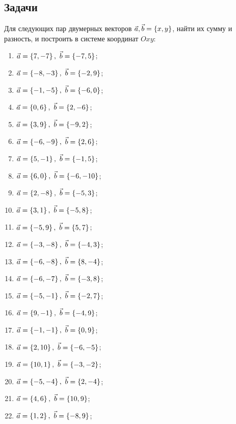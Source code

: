 \subsection{Задачи}

	Для следующих пар двумерных векторов $\va, \vb = \bracs{x, y}$, найти их сумму и разность, и построить в системе координат $Oxy$:

	\begin{multicols}{2}
		\begin{enumerate}
			\setcounter{enumi}{\value{tasks}}

			\item \( \displaystyle \va = \bracs{7, -7}, ~ \vb = \bracs{-7, 5} \);
			\item \( \displaystyle \va = \bracs{-8, -3}, ~ \vb = \bracs{-2, 9} \);
			\item \( \displaystyle \va = \bracs{-1, -5}, ~ \vb = \bracs{-6, 0} \);
			\item \( \displaystyle \va = \bracs{0, 6}, ~ \vb = \bracs{2, -6} \);
			\item \( \displaystyle \va = \bracs{3, 9}, ~ \vb = \bracs{-9, 2} \);
			\item \( \displaystyle \va = \bracs{-6, -9}, ~ \vb = \bracs{2, 6} \);
			\item \( \displaystyle \va = \bracs{5, -1}, ~ \vb = \bracs{-1, 5} \);
			\item \( \displaystyle \va = \bracs{6, 0}, ~ \vb = \bracs{-6, -10} \);
			\item \( \displaystyle \va = \bracs{2, -8}, ~ \vb = \bracs{-5, 3} \);
			\item \( \displaystyle \va = \bracs{3, 1}, ~ \vb = \bracs{-5, 8} \);
			\item \( \displaystyle \va = \bracs{-5, 9}, ~ \vb = \bracs{5, 7} \);
			\item \( \displaystyle \va = \bracs{-3, -8}, ~ \vb = \bracs{-4, 3} \);
			\item \( \displaystyle \va = \bracs{-6, -8}, ~ \vb = \bracs{8, -4} \);
			\item \( \displaystyle \va = \bracs{-6, -7}, ~ \vb = \bracs{-3, 8} \);
			\item \( \displaystyle \va = \bracs{-5, -1}, ~ \vb = \bracs{-2, 7} \);
			\item \( \displaystyle \va = \bracs{9, -1}, ~ \vb = \bracs{-4, 9} \);
			\item \( \displaystyle \va = \bracs{-1, -1}, ~ \vb = \bracs{0, 9} \);
			\item \( \displaystyle \va = \bracs{2, 10}, ~ \vb = \bracs{-6, -5} \);
			\item \( \displaystyle \va = \bracs{10, 1}, ~ \vb = \bracs{-3, -2} \);
			\item \( \displaystyle \va = \bracs{-5, -4}, ~ \vb = \bracs{2, -4} \);
			\item \( \displaystyle \va = \bracs{4, 6}, ~ \vb = \bracs{10, 9} \);
			\item \( \displaystyle \va = \bracs{1, 2}, ~ \vb = \bracs{-8, 9} \);

			\setcounter{tasks}{\value{enumi}}
		\end{enumerate}
	\end{multicols}

